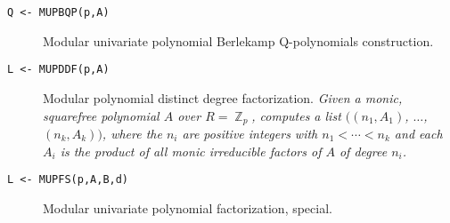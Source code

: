 \begin{description}
\begin{description}
  \item[{\tt Q <- MUPBQP(p,A) 
}] Modular univariate polynomial Berlekamp Q-polynomials
                construction.

  \item[{\tt L <- MUPDDF(p,A) 
}] Modular polynomial distinct degree factorization. {\em
Given a monic, squarefree polynomial $A$ over $R = \BbbZ_p$,
computes a list $((n_1,A_1)$, $\ldots$, $(n_k,A_k))$, where the $n_i$ are
positive integers with $n_1 < \cdots < n_k$ and each $A_i$ is the
product of all monic irreducible factors of $A$ of degree $n_i$.}

  \item[{\tt L <- MUPFS(p,A,B,d) 
}] Modular univariate polynomial factorization, special.

  \end{description}  %


\end{description}  %

